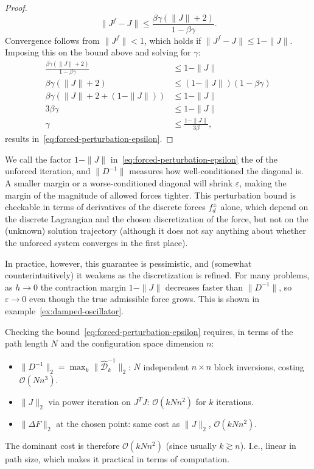 \begin{proof}
	\[
		\|J^f - J\| \leq \frac{\beta\gamma(\|J\| + 2)}{1 - \beta\gamma}.
	\]
	Convergence follows from $\|J^f\| < 1$, which holds if $\|J^f - J\| \leq 1 - \|J\|$. Imposing this on the bound above and solving for $\gamma$:
	\begin{align*}
		\frac{\beta\gamma(\|J\| + 2)}{1 - \beta\gamma} & \leq 1 - \|J\|                  \\
		\beta\gamma(\|J\| + 2)                         & \leq (1-\|J\|)(1 - \beta\gamma) \\
		\beta\gamma\left(\|J\| + 2 + (1-\|J\|)\right)  & \leq 1 - \|J\|                  \\
		3\beta\gamma                                   & \leq 1 - \|J\|                  \\
		\gamma                                         & \leq \frac{1-\|J\|}{3\beta},
	\end{align*}
	results in~\eqref{eq:forced-perturbation-epsilon}.
\end{proof}

We call the factor $1 - \|J\|$ in~\eqref{eq:forced-perturbation-epsilon} the  of the unforced iteration, and $\|D^{-1}\|$ measures how well-conditioned the diagonal is. A smaller margin or a worse-conditioned diagonal will shrink $\varepsilon$, making the margin of the magnitude of allowed forces tighter.
This perturbation bound is checkable in terms of derivatives of the discrete forces $f_d^\pm$ alone, which depend on the discrete Lagrangian and the chosen discretization of the force, but not on the (unknown) solution trajectory (although it does not say anything about whether the unforced system converges in the first place).

In practice, however, this guarantee is pessimistic, and (somewhat counterintuitively) it weakens as the discretization is refined. For many problems, as $h \to 0$ the contraction margin $1 - \|J\|$ decreases faster than $\|D^{-1}\|$, so $\varepsilon \to 0$ even though the true admissible force grows. This is shown in example~\ref{ex:damped-oscillator}.

\medskip


\begin{remark}\label{rem:forced-perturbation-complexity}
	Checking the bound~\eqref{eq:forced-perturbation-epsilon} requires, in terms of the path length $N$ and the configuration space dimension $n$:
	\begin{itemize}
		\item $\|D^{-1}\|_2 = \max_k \|\hat{\mathcal{D}}_k^{-1}\|_2$: $N$ independent $n \times n$ block inversions, costing $\mathcal{O}(N n^3)$.
		\item $\|J\|_2$ via power iteration on $J^T J$: $\mathcal{O}(k N n^2)$ for $k$ iterations.
		\item $\|\Delta F\|_2$ at the chosen point: same cost as $\|J\|_2$, $\mathcal{O}(k N n^2)$.
	\end{itemize}
	The dominant cost is therefore $\mathcal{O}(k N n^2)$ (since usually $k \gtrsim n$). I.e., linear in path size, which makes it practical in terms of computation.
\end{remark}

